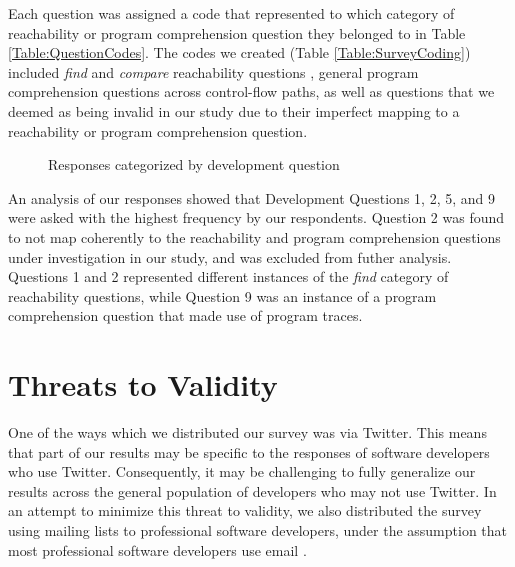 \par Each question was assigned a code that represented to which category of
reachability or program comprehension question they belonged to in
Table \ref{Table:QuestionCodes}.
The codes we created (Table \ref{Table:SurveyCoding}) included \textit{find} 
and \textit{compare} reachability questions \cite{latoza-2010-reach}, general 
program comprehension questions across control-flow paths, as well as questions 
that we deemed as being invalid in our study due to their imperfect mapping to 
a reachability or program comprehension question. 



\begin{figure}[ht]
\centering
\caption{Responses categorized by development question}

\label{fig:SurveyResults}
\end{figure}

\par An analysis of our responses showed that Development Questions 1, 2, 5,
and 9 were asked with the highest frequency by our respondents.
Question 2 was found to not map coherently to the reachability and program
comprehension questions under investigation in our study, and was excluded
from futher analysis.
Questions 1 and 2 represented different instances of the \textit{find} category 
of reachability questions, while Question 9 was an instance of a program
comprehension question that made use of program traces.



\section{Threats to Validity}
\label{sec:ThreatsToValidity}


\noindent One of the ways which we distributed our survey was via Twitter.  
This means that part of our results may be specific to the responses of
software developers who use Twitter.
Consequently, it may be challenging to fully generalize our results across
the general population of developers who may not use Twitter.
In an attempt to minimize this threat to validity, we also distributed the 
survey using mailing lists to professional software developers, under the
assumption that most professional software developers use email
\cite{gousios-2016-work-practices}.

